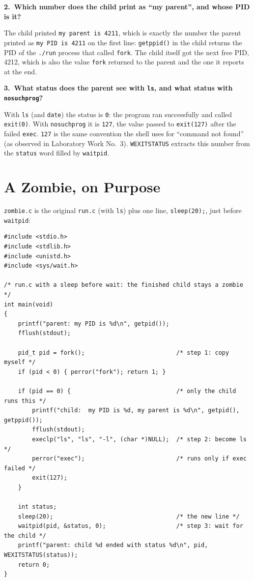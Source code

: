 \documentclass[12pt,a4paper]{article}
\newcommand{\qa}[2]{%
  \par\needspace{5\baselineskip}\medskip
  \noindent\textbf{#1.~#2}\par\smallskip\noindent}
\begin{document}
\qa{2}{Which number does the child print as ``my parent'', and whose PID is it?}
The child printed \texttt{my parent is 4211}, which is exactly the number the parent printed as \texttt{my PID is 4211} on the first line: \texttt{getppid()} in the child returns the PID of the \texttt{./run} process that called \texttt{fork}. The child itself got the next free PID, 4212, which is also the value \texttt{fork} returned to the parent and the one it reports at the end.

\qa{3}{What status does the parent see with \texttt{ls}, and what status with \texttt{nosuchprog}?}
With \texttt{ls} (and \texttt{date}) the status is \texttt{0}: the program ran successfully and called \texttt{exit(0)}. With \texttt{nosuchprog} it is \texttt{127}, the value passed to \texttt{exit(127)} after the failed \texttt{exec}. \texttt{127} is the same convention the shell uses for ``command not found'' (as observed in Laboratory Work No.~3). \texttt{WEXITSTATUS} extracts this number from the \texttt{status} word filled by \texttt{waitpid}.

\newpage
\section{A Zombie, on Purpose}

\texttt{zombie.c} is the original \texttt{run.c} (with \texttt{ls}) plus one line, \texttt{sleep(20);}, just before \texttt{waitpid}:

\begin{lstlisting}[style=code,caption={zombie.c}]
#include <stdio.h>
#include <stdlib.h>
#include <unistd.h>
#include <sys/wait.h>

/* run.c with a sleep before wait: the finished child stays a zombie */
int main(void)
{
    printf("parent: my PID is %d\n", getpid());
    fflush(stdout);

    pid_t pid = fork();                          /* step 1: copy myself */
    if (pid < 0) { perror("fork"); return 1; }

    if (pid == 0) {                              /* only the child runs this */
        printf("child:  my PID is %d, my parent is %d\n", getpid(), getppid());
        fflush(stdout);
        execlp("ls", "ls", "-l", (char *)NULL);  /* step 2: become ls */
        perror("exec");                          /* runs only if exec failed */
        exit(127);
    }

    int status;
    sleep(20);                                   /* the new line */
    waitpid(pid, &status, 0);                    /* step 3: wait for the child */
    printf("parent: child %d ended with status %d\n", pid, WEXITSTATUS(status));
    return 0;
}
\end{lstlisting}
\end{document}
